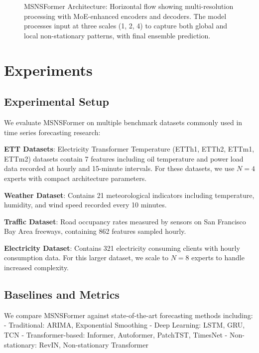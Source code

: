 \documentclass{article}
\begin{document}
\begin{figure*}[t]
\caption{MSNSFormer Architecture: Horizontal flow showing multi-resolution processing with MoE-enhanced encoders and decoders. The model processes input at three scales (1, 2, 4) to capture both global and local non-stationary patterns, with final ensemble prediction.}
\label{fig:architecture}
\end{figure*}

\section{Experiments}
\label{sec:experiments}

\subsection{Experimental Setup}
We evaluate MSNSFormer on multiple benchmark datasets commonly used in time series forecasting research:

\textbf{ETT Datasets}: Electricity Transformer Temperature (ETTh1, ETTh2, ETTm1, ETTm2) datasets contain 7 features including oil temperature and power load data recorded at hourly and 15-minute intervals. For these datasets, we use $N=4$ experts with compact architecture parameters.

\textbf{Weather Dataset}: Contains 21 meteorological indicators including temperature, humidity, and wind speed recorded every 10 minutes.

\textbf{Traffic Dataset}: Road occupancy rates measured by sensors on San Francisco Bay Area freeways, containing 862 features sampled hourly.

\textbf{Electricity Dataset}: Contains 321 electricity consuming clients with hourly consumption data. For this larger dataset, we scale to $N=8$ experts to handle increased complexity.

\subsection{Baselines and Metrics}
We compare MSNSFormer against state-of-the-art forecasting methods including:
- Traditional: ARIMA, Exponential Smoothing
- Deep Learning: LSTM, GRU, TCN
- Transformer-based: Informer, Autoformer, PatchTST, TimesNet
- Non-stationary: RevIN, Non-stationary Transformer
\end{document}
